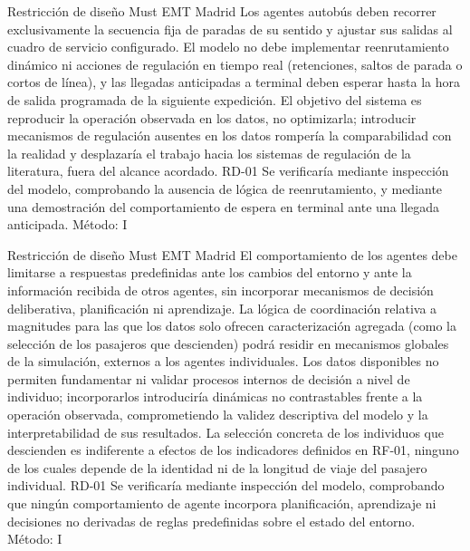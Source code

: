{Restricción de diseño}
{Must}
{EMT Madrid}
{Los agentes autobús deben recorrer exclusivamente la secuencia fija de paradas de su sentido y ajustar sus
salidas al cuadro de servicio configurado. El modelo no debe implementar reenrutamiento dinámico ni acciones de
regulación en tiempo real (retenciones, saltos de parada o cortos de línea), y las llegadas anticipadas a terminal
deben esperar hasta la hora de salida programada de la siguiente expedición.}
{El objetivo del sistema es reproducir la operación observada en los datos, no optimizarla; introducir mecanismos
de regulación ausentes en los datos rompería la comparabilidad con la realidad y desplazaría el trabajo hacia los
sistemas de regulación de la literatura, fuera del alcance acordado.}
{RD-01}
{Se verificaría mediante inspección del modelo, comprobando la ausencia de lógica de reenrutamiento, y mediante
una demostración del comportamiento de espera en terminal ante una llegada anticipada. Método: I}

{Restricción de diseño}
{Must}
{EMT Madrid}
{El comportamiento de los agentes debe limitarse a respuestas predefinidas ante los cambios del entorno y ante la información
recibida de otros agentes, sin incorporar mecanismos de decisión deliberativa, planificación ni aprendizaje. La lógica de coordinación
relativa a magnitudes para las que los datos solo ofrecen caracterización agregada (como la selección de los pasajeros que descienden)
podrá residir en mecanismos globales de la simulación, externos a los agentes individuales.}
{Los datos disponibles no permiten fundamentar ni validar procesos internos de
decisión a nivel de individuo; incorporarlos introduciría dinámicas no
contrastables frente a la operación observada, comprometiendo la validez
descriptiva del modelo y la interpretabilidad de sus resultados. La selección
concreta de los individuos que descienden es indiferente a efectos de los
indicadores definidos en RF-01, ninguno de los cuales depende de la identidad ni
de la longitud de viaje del pasajero individual.}
{RD-01}
{Se verificaría mediante inspección del modelo, comprobando que ningún comportamiento de agente
incorpora planificación, aprendizaje ni decisiones no derivadas de reglas
predefinidas sobre el estado del entorno. Método: I}

